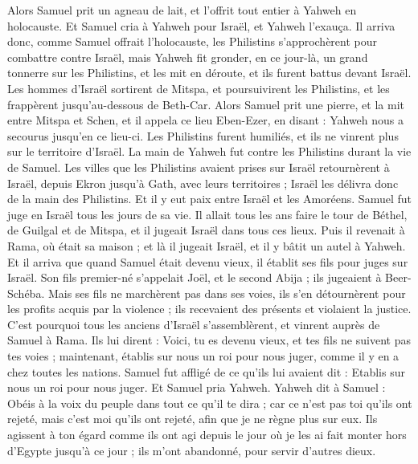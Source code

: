 \begin{multicols}{2}
Alors Samuel prit un agneau de lait, et l'offrit tout entier à Yahweh en holocauste. Et Samuel cria à Yahweh pour Israël, et Yahweh l'exauça.
Il arriva donc, comme Samuel offrait l'holocauste, les Philistins s'approchèrent pour combattre contre Israël, mais Yahweh fit gronder, en ce jour-là, un grand tonnerre sur les Philistins, et les mit en déroute, et ils furent battus devant Israël.
Les hommes d'Israël sortirent de Mitspa, et poursuivirent les Philistins, et les frappèrent jusqu'au-dessous de Beth-Car.
Alors Samuel prit une pierre, et la mit entre Mitspa et Schen, et il appela ce lieu Eben-Ezer, en disant : Yahweh nous a secourus jusqu'en ce lieu-ci.
Les Philistins furent humiliés, et ils ne vinrent plus sur le territoire d'Israël. La main de Yahweh fut contre les Philistins durant la vie de Samuel.
Les villes que les Philistins avaient prises sur Israël retournèrent à Israël, depuis Ekron jusqu'à Gath, avec leurs territoires ; Israël les délivra donc de la main des Philistins. Et il y eut paix entre Israël et les Amoréens.
Samuel fut juge en Israël tous les jours de sa vie.
Il allait tous les ans faire le tour de Béthel, de Guilgal et de Mitspa, et il jugeait Israël dans tous ces lieux.
Puis il revenait à Rama, où était sa maison ; et là il jugeait Israël, et il y bâtit un autel à Yahweh.
\VerseOne{}Et il arriva que quand Samuel était devenu vieux, il établit ses fils pour juges sur Israël.
Son fils premier-né s'appelait Joël, et le second Abija ; ils jugeaient à Beer-Schéba.
Mais ses fils ne marchèrent pas dans ses voies, ils s'en détournèrent pour les profits acquis par la violence ; ils recevaient des présents et violaient la justice.
C'est pourquoi tous les anciens d'Israël s'assemblèrent, et vinrent auprès de Samuel à Rama.
Ils lui dirent : Voici, tu es devenu vieux, et tes fils ne suivent pas tes voies ; maintenant, établis sur nous un roi pour nous juger, comme il y en a chez toutes les nations.
Samuel fut affligé de ce qu'ils lui avaient dit : Etablis sur nous un roi pour nous juger. Et Samuel pria Yahweh.
Yahweh dit à Samuel : Obéis à la voix du peuple dans tout ce qu'il te dira ; car ce n'est pas toi qu'ils ont rejeté, mais c'est moi qu'ils ont rejeté, afin que je ne règne plus sur eux.
Ils agissent à ton égard comme ils ont agi depuis le jour où je les ai fait monter hors d'Egypte jusqu'à ce jour ; ils m'ont abandonné, pour servir d'autres dieux.

\end{multicols}
